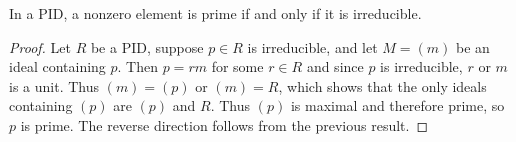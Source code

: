\documentclass[../m171main.tex]{subfiles}
\begin{document}
\begin{theorem}[]
    In a PID, a nonzero element is prime if and only if it is irreducible.
\end{theorem}

\begin{proof}
    Let $R$ be a PID, suppose $p \in R$ is irreducible, and let $M = (m)$ be an ideal containing $p$.
    Then $p = rm$ for some $r \in R$ and since $p$ is irreducible, $r$ or $m$ is a unit.
    Thus $(m) = (p)$ or $(m) = R$, which shows that the only ideals containing $(p)$ are $(p)$ and $R$.
    Thus $(p)$ is maximal and therefore prime, so $p$ is prime.
    The reverse direction follows from the previous result.
\end{proof}

\end{document}
